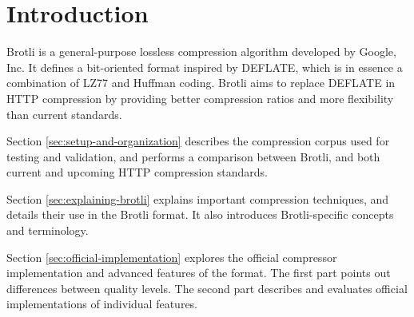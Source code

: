 \documentclass[english,master,dept460,male,cpp,cpdeclaration]{diploma}
\newif\ifSIMPLIFIED
\begin{document}
\MakeTitlePages





\section{Introduction}

Brotli is a general-purpose lossless compression algorithm developed by Google, Inc. It defines a bit-oriented format inspired by DEFLATE\cite{RFC1951}, which is in essence a combination of LZ77 and Huffman coding. Brotli aims to replace DEFLATE in HTTP compression by providing better compression ratios and more flexibility than current standards.

\ifSIMPLIFIED

Section \ref{sec:setup-and-organization} describes the compression corpus used for testing and validation, and performs a comparison between Brotli, and both current and upcoming HTTP compression standards.

Section \ref{sec:explaining-brotli} explains important compression techniques, and details their use in the Brotli format. It also introduces Brotli-specific concepts and terminology.

Section \ref{sec:official-implementation} explores the official compressor implementation and advanced features of the format. The first part points out differences between quality levels. The second part describes and evaluates official implementations of individual features.
\end{document}
